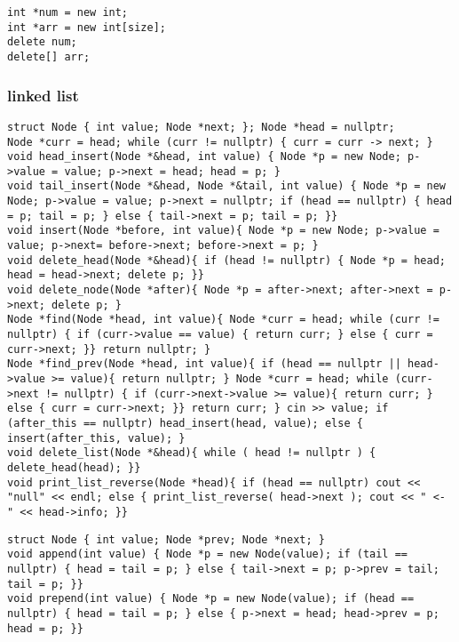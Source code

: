 \documentclass[10pt]{article}
\begin{document}
\begin{multicols*}{2}
\begin{tcolorbox}[halign=left]
\begin{verbatim}
int *num = new int;
int *arr = new int[size];
delete num;
delete[] arr;
        \end{verbatim}
    \end{tcolorbox}

    \subsubsection*{linked list}
    \begin{tiny}
        \begin{tcolorbox}[halign=left]
            \begin{verbatim}
struct Node { int value; Node *next; }; Node *head = nullptr;
Node *curr = head; while (curr != nullptr) { curr = curr -> next; }
void head_insert(Node *&head, int value) { Node *p = new Node; p->value = value; p->next = head; head = p; }
void tail_insert(Node *&head, Node *&tail, int value) { Node *p = new Node; p->value = value; p->next = nullptr; if (head == nullptr) { head = p; tail = p; } else { tail->next = p; tail = p; }}
void insert(Node *before, int value){ Node *p = new Node; p->value = value; p->next= before->next; before->next = p; }
void delete_head(Node *&head){ if (head != nullptr) { Node *p = head; head = head->next; delete p; }}
void delete_node(Node *after){ Node *p = after->next; after->next = p->next; delete p; }
Node *find(Node *head, int value){ Node *curr = head; while (curr != nullptr) { if (curr->value == value) { return curr; } else { curr = curr->next; }} return nullptr; }
Node *find_prev(Node *head, int value){ if (head == nullptr || head->value >= value){ return nullptr; } Node *curr = head; while (curr->next != nullptr) { if (curr->next->value >= value){ return curr; } else { curr = curr->next; }} return curr; } cin >> value; if (after_this == nullptr) head_insert(head, value); else { insert(after_this, value); }
void delete_list(Node *&head){ while ( head != nullptr ) { delete_head(head); }}
void print_list_reverse(Node *head){ if (head == nullptr) cout << "null" << endl; else { print_list_reverse( head->next ); cout << " <- " << head->info; }}
            \end{verbatim}
        \end{tcolorbox}
        \begin{tcolorbox}[halign=left]
            \begin{verbatim}
struct Node { int value; Node *prev; Node *next; }
void append(int value) { Node *p = new Node(value); if (tail == nullptr) { head = tail = p; } else { tail->next = p; p->prev = tail; tail = p; }}
void prepend(int value) { Node *p = new Node(value); if (head == nullptr) { head = tail = p; } else { p->next = head; head->prev = p; head = p; }} 
            \end{verbatim}
        \end{tcolorbox}
    \end{tiny}


\end{multicols*}
\end{document}
